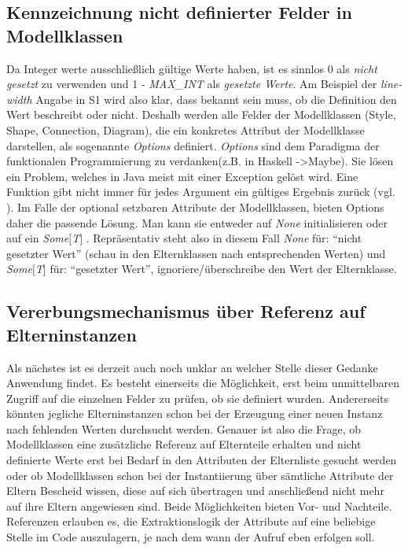 \subsection{Kennzeichnung nicht definierter Felder in Modellklassen}
Da Integer werte ausschließlich gültige Werte haben, ist es sinnlos 0 als \textit{nicht gesetzt} zu verwenden und 1 - \textit{MAX\_INT} als \textit{gesetzte Werte}. Am Beispiel der \textit{line-width} Angabe in S1 wird also klar, dass bekannt sein muss, ob die Definition den Wert beschreibt oder nicht. 
Deshalb werden alle Felder der Modellklassen (Style, Shape, Connection, Diagram), die ein konkretes Attribut der Modellklasse darstellen, als sogenannte \textit{Options} definiert. \textit{Options} sind dem Paradigma der funktionalen Programmierung zu verdanken(z.B. in Haskell -\textgreater Maybe).
Sie lösen ein Problem, welches in Java meist mit einer Exception gelöst wird.
Eine Funktion gibt nicht immer für jedes Argument ein gültiges Ergebnis zurück (vgl. ). Im Falle der optional setzbaren Attribute der Modellklassen, bieten Options daher die passende Lösung. Man kann sie entweder auf \textit{None} initialisieren oder auf ein \textit{Some$[$T$]$ }. Repräsentativ steht also in diesem Fall \textit{None} für: "`nicht gesetzter Wert"' (schau in den Elternklassen nach entsprechenden Werten) und \textit{Some$[$T$]$} für: "`gesetzter Wert"', ignoriere/überschreibe den Wert der Elternklasse.
\subsection{Vererbungsmechanismus über Referenz auf Elterninstanzen}
Als nächstes ist es derzeit auch noch unklar an welcher Stelle dieser Gedanke Anwendung findet. Es besteht einerseits die Möglichkeit, erst beim unmittelbaren Zugriff auf die einzelnen Felder zu prüfen, ob sie definiert wurden. Andererseits könnten jegliche Elterninstanzen schon bei der Erzeugung einer neuen Instanz nach fehlenden Werten durchsucht werden. Genauer ist also die Frage, ob Modellklassen eine zusätzliche Referenz auf Elternteile erhalten und nicht definierte Werte erst bei Bedarf in den Attributen der Elternliste gesucht werden oder ob Modellklassen schon bei der Instantiierung über sämtliche Attribute der Eltern Bescheid wissen, diese auf sich übertragen und anschließend nicht mehr auf ihre Eltern angewiesen sind. Beide Möglichkeiten bieten Vor- und Nachteile. Referenzen erlauben es, die Extraktionslogik der Attribute auf eine beliebige Stelle im Code auszulagern, je nach dem wann der Aufruf eben erfolgen soll. 
